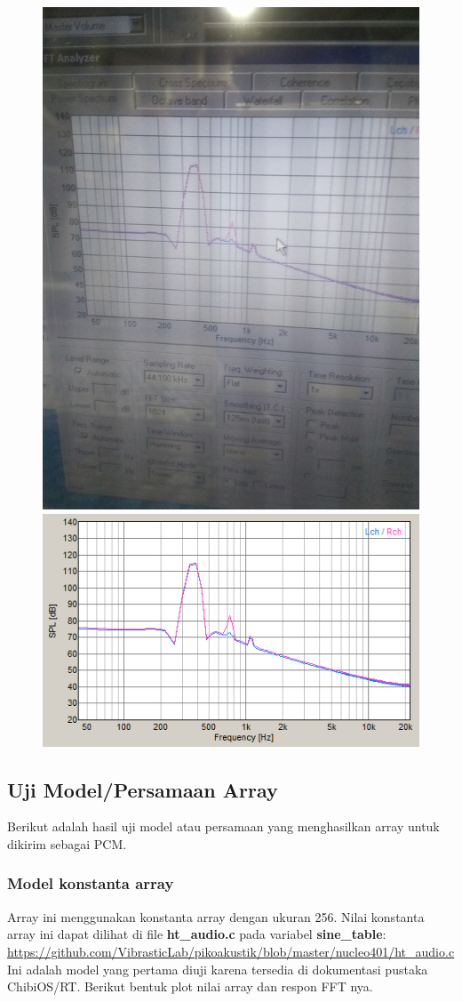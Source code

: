 \documentclass[12pt,]{article}
\begin{document}
\begin{itemize}
		\begin{figure}[H]
			\centering
			\includegraphics[width=0.3\linewidth]{day_1/test0}
			\includegraphics[width=0.6\linewidth]{day_1/test1}
		\end{figure}
	\end{itemize}

	\subsection{Uji Model/Persamaan Array}

	Berikut adalah hasil uji model atau persamaan yang menghasilkan array untuk dikirim sebagai PCM.

	\subsubsection{Model konstanta array}
	Array ini menggunakan konstanta array dengan ukuran 256.
	Nilai konstanta array ini dapat dilihat di file \textbf{ht\_audio.c} pada variabel \textbf{sine\_table}:\\
	\url{https://github.com/VibrasticLab/pikoakustik/blob/master/nucleo401/ht_audio.c}\\
	Ini adalah model yang pertama diuji karena tersedia di dokumentasi pustaka ChibiOS/RT.
	Berikut bentuk plot nilai array dan respon FFT nya.
\end{document}
